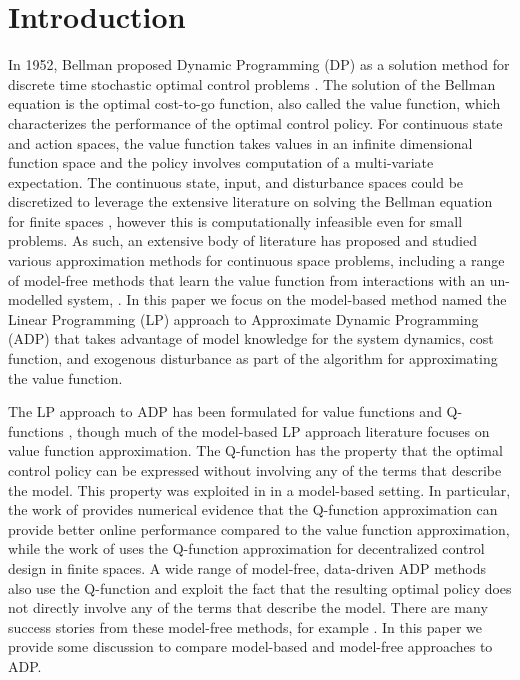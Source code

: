 \documentclass[journal]{IEEEtran}
\newcommand{\textQ}{Q}
\begin{document}
\section{Introduction} \label{sec:intro}

In 1952, Bellman proposed Dynamic Programming (DP) as a solution method for discrete time stochastic optimal control problems \cite{bellman_1952_theory}.
The solution of the Bellman equation is the optimal cost-to-go function, also called the value function, which characterizes the performance of the optimal control policy.
For continuous state and action spaces, the value function takes values in an infinite dimensional function space and the policy involves computation of a multi-variate expectation.
The continuous state, input, and disturbance spaces could be discretized to leverage the extensive literature on solving the Bellman equation for finite spaces \cite{bertsekas_2017_DP_vol1,puterman_2005_MDPs}, however this is computationally infeasible even for small problems.
As such, an extensive body of literature has proposed and studied various approximation methods for continuous space problems, including a range of model-free methods that learn the value function from interactions with an un-modelled system, \cite{sutton_1988_TDlearning,bertsekas_1995_neuroBook,reviewer_suggestion_2016_modelfree,google_2015_atari}.
In this paper we focus on the model-based method named the Linear Programming (LP) approach to Approximate Dynamic Programming (ADP) \cite{schweitzer_originalMDP} that takes advantage of model knowledge for the system dynamics, cost function, and exogenous disturbance as part of the algorithm for approximating the value function.





The LP approach to ADP has been formulated for value functions \cite{vanRoy_linApproxDP} and \textQ-functions \cite{vanroy_decentADP}, though much of the model-based LP approach literature focuses on value function approximation.
The \textQ-function has the property that the optimal control policy can be expressed without involving any of the terms that describe the model.
This property was exploited in \cite{vanroy_decentADP,beuchat_2016_ECC_PWMQ} in a model-based setting.
In particular, the work of \cite{beuchat_2016_ECC_PWMQ} provides numerical evidence that the \textQ-function approximation can provide better online performance compared to the value function approximation, while the work of \cite{vanroy_decentADP} uses the \textQ-function approximation for decentralized control design in finite spaces.
A wide range of model-free, data-driven ADP methods also use the \textQ-function and exploit the fact that the resulting optimal policy does not directly involve any of the terms that describe the model. There are many success stories from these model-free methods, for example \cite{watkins_1989_learningFromDelayedRewards, reviewer_suggestion_2018_Qlearning_experience_replay,meyn_2017_zap_qlearning}.
In this paper we provide some discussion to compare model-based and model-free approaches to ADP.
\end{document}
